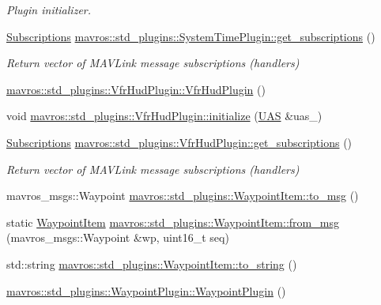 \begin{DoxyCompactItemize}
\begin{DoxyCompactList}\small\item\em Plugin initializer. \end{DoxyCompactList}\item 
\mbox{\hyperlink{group__plugin_ga8967d61fc77040e0c3ea5a4585d62a09}{Subscriptions}} \mbox{\hyperlink{group__plugin_gab01303b0702a925da36b38cb1d1a1d45}{mavros\+::std\+\_\+plugins\+::\+System\+Time\+Plugin\+::get\+\_\+subscriptions}} ()
\begin{DoxyCompactList}\small\item\em Return vector of M\+A\+V\+Link message subscriptions (handlers) \end{DoxyCompactList}\item 
\mbox{\hyperlink{group__plugin_ga3657bfeb1a29cd38bf912fa874f7b72b}{mavros\+::std\+\_\+plugins\+::\+Vfr\+Hud\+Plugin\+::\+Vfr\+Hud\+Plugin}} ()
\item 
void \mbox{\hyperlink{group__plugin_gacf050334e6d790e496ca5a35a5e34f2d}{mavros\+::std\+\_\+plugins\+::\+Vfr\+Hud\+Plugin\+::initialize}} (\mbox{\hyperlink{classmavros_1_1UAS}{U\+AS}} \&uas\+\_\+)
\item 
\mbox{\hyperlink{group__plugin_ga8967d61fc77040e0c3ea5a4585d62a09}{Subscriptions}} \mbox{\hyperlink{group__plugin_ga432994278dd02aa09f57ab7dc93fa109}{mavros\+::std\+\_\+plugins\+::\+Vfr\+Hud\+Plugin\+::get\+\_\+subscriptions}} ()
\begin{DoxyCompactList}\small\item\em Return vector of M\+A\+V\+Link message subscriptions (handlers) \end{DoxyCompactList}\item 
mavros\+\_\+msgs\+::\+Waypoint \mbox{\hyperlink{group__plugin_ga5c25947a645ea543c7b198bb3c497ac9}{mavros\+::std\+\_\+plugins\+::\+Waypoint\+Item\+::to\+\_\+msg}} ()
\item 
static \mbox{\hyperlink{classmavros_1_1std__plugins_1_1WaypointItem}{Waypoint\+Item}} \mbox{\hyperlink{group__plugin_gac1275a7e8aa3ffb259d1009078a56d44}{mavros\+::std\+\_\+plugins\+::\+Waypoint\+Item\+::from\+\_\+msg}} (mavros\+\_\+msgs\+::\+Waypoint \&wp, uint16\+\_\+t seq)
\item 
std\+::string \mbox{\hyperlink{group__plugin_ga6eeb2ff1ea806b477e297f08f356115a}{mavros\+::std\+\_\+plugins\+::\+Waypoint\+Item\+::to\+\_\+string}} ()
\item 
\mbox{\hyperlink{group__plugin_ga6aff35d26d32a5d88603dd85119c1056}{mavros\+::std\+\_\+plugins\+::\+Waypoint\+Plugin\+::\+Waypoint\+Plugin}} ()
\item 

\end{DoxyCompactItemize}
